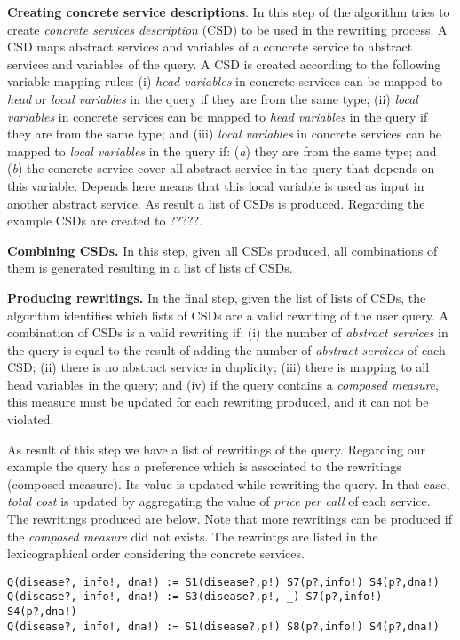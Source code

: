 \noindent \textbf{Creating concrete service descriptions}. In this step of the algorithm tries to create \textit{concrete services description} (CSD) to be used in the rewriting process. A CSD maps abstract services and variables of a concrete service to abstract services and variables of the query. A CSD is created according to the following variable mapping rules: (i) \textit{head variables} in concrete services can be mapped to \textit{head} or \textit{local variables} in the query if they are from the same type; (ii) \textit{local variables} in concrete services can be mapped to \textit{head variables} in the query if they are from the same type; and (iii) \textit{local variables} in concrete services can be mapped to \textit{local variables} in the query if: (\textit{a}) they are from the same type; and (\textit{b}) the concrete service cover all abstract service in the query that depends on this variable. Depends here means that this local variable is used as input in another abstract service.
As result a list of CSDs is produced. Regarding the example CSDs are created to ?????.

\noindent \textbf{Combining CSDs.} In this step, given all CSDs produced, all combinations of them is generated resulting in a list of lists of CSDs.

\noindent \textbf{Producing rewritings.} In the final step, given the list of lists of CSDs, the algorithm identifies which lists of CSDs are a valid rewriting of the user query. 
A combination of CSDs is a valid rewriting if: (i) the number of \textit{abstract services} in the query is equal to the result of adding the number of \textit{abstract services} of each CSD; (ii) there is no abstract service in duplicity; (iii) there is mapping to all head variables in the query; and (iv) if the query contains a \textit{composed measure}, this measure must be updated for each rewriting produced, and it can not be violated.

As result of this step we have a list of rewritings of the query. Regarding our example the query has a preference which is associated to the rewritings (composed measure). Its value is updated while rewriting the query. In that case, \emph{total cost} is updated by aggregating the value of \emph{price per call} of each service. The rewritings produced are below. Note that more rewritings can be produced if the \textit{composed measure} did not exists. The rewrintgs are listed in the lexicographical order considering the concrete services.
\begin{tiny}
\begin{verbatim}
Q(disease?, info!, dna!) := S1(disease?,p!) S7(p?,info!) S4(p?,dna!)
Q(disease?, info!, dna!) := S3(disease?,p!, _) S7(p?,info!) S4(p?,dna!)
Q(disease?, info!, dna!) := S1(disease?,p!) S8(p?,info!) S4(p?,dna!)
\end{verbatim}
\end{tiny}